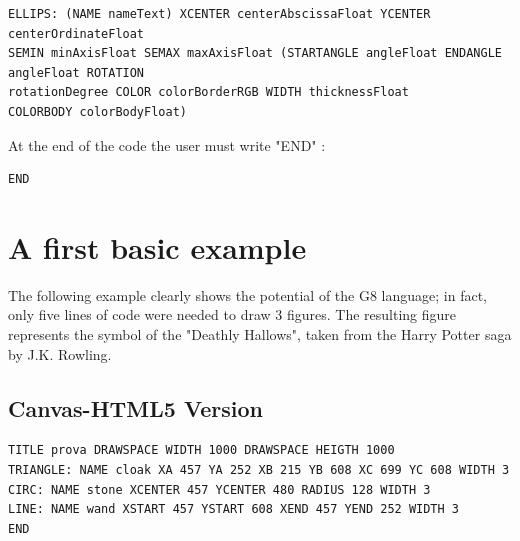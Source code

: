 \documentclass[a4paper]{article}
\begin{document}
\begin{itemize}
\begin{verbatim}
ELLIPS: (NAME nameText) XCENTER centerAbscissaFloat YCENTER centerOrdinateFloat 
SEMIN minAxisFloat SEMAX maxAxisFloat (STARTANGLE angleFloat ENDANGLE angleFloat ROTATION
rotationDegree COLOR colorBorderRGB WIDTH thicknessFloat 
COLORBODY colorBodyFloat)
\end{verbatim}
\end{itemize}
At the end of the code the user must write "END" :
\begin{verbatim}
END
\end{verbatim}

\section{A first basic example}

The following example clearly shows the potential of the G8 language; in fact, only five lines of code were needed to draw 3 figures.
The resulting figure represents the symbol of the "Deathly Hallows", taken from the Harry Potter saga by J.K. Rowling.

\subsection{Canvas-HTML5 Version}
\begin{verbatim}
TITLE prova DRAWSPACE WIDTH 1000 DRAWSPACE HEIGTH 1000
TRIANGLE: NAME cloak XA 457 YA 252 XB 215 YB 608 XC 699 YC 608 WIDTH 3
CIRC: NAME stone XCENTER 457 YCENTER 480 RADIUS 128 WIDTH 3
LINE: NAME wand XSTART 457 YSTART 608 XEND 457 YEND 252 WIDTH 3
END
\end{verbatim}
\end{document}
